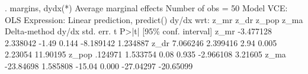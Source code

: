 . margins, dydx(*) 
{\smallskip}
Average marginal effects                                    Number of obs = 50
Model VCE: OLS
{\smallskip}
Expression: Linear prediction, predict()
dy/dx wrt:  z_mr z_dr z_pop z_ma
{\smallskip}
             {\VBAR}            Delta-method
             {\VBAR}      dy/dx   std. err.      t    P>|t|     [95\% conf. interval]
        z_mr {\VBAR}  -3.477128   2.338042    -1.49   0.144    -8.189142    1.234887
        z_dr {\VBAR}   7.066246   2.399416     2.94   0.005      2.23054    11.90195
       z_pop {\VBAR}    .124971   1.533754     0.08   0.935    -2.966108     3.21605
        z_ma {\VBAR}  -23.84698   1.585808   -15.04   0.000    -27.04297   -20.65099
